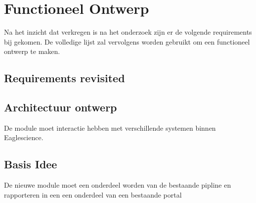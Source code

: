 
\chapter{Functioneel Ontwerp}\label{ch:functioneel-ontwerp} %

\label{funtioneelOntwerp} %


Na het inzicht dat verkregen is na het onderzoek zijn er de volgende requirements bij gekomen.
De volledige lijst zal vervolgens worden gebruikt om een functioneel ontwerp te maken.

\section{Requirements revisited}\label{sec:requirements-revisited}


\section{Architectuur ontwerp}\label{sec:architectuur-ontwerp}
De module moet interactie hebben met verschillende systemen binnen Eaglescience.


\section{Basis Idee}\label{sec:basis-idee}
De nieuwe module moet een onderdeel worden van de bestaande pipline en rapporteren in een een onderdeel van een bestaande portal
